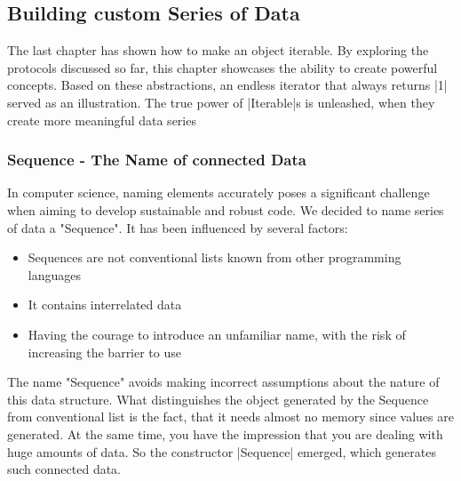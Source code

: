 \subsection{Building custom Series of Data}
\label{sub:Building custom Series of Data}
The last chapter has shown how to make an object iterable. By exploring the 
protocols discussed so far, this chapter showcases the ability to create 
powerful concepts. Based on these abstractions, an endless iterator that always
returns |1| served as an illustration. The true power of |Iterable|s is 
unleashed, when they create more meaningful data series
\subsubsection{Sequence - The Name of connected Data}
\label{subsub:Sequence - The Name of connected Data}
In computer science, naming elements accurately poses a significant challenge 
when aiming to develop sustainable and robust code. We decided to name series
of data a "Sequence". It has been influenced by several factors:

\begin{itemize}
  \item{Sequences are not conventional lists known from other programming languages}
  \item{It contains interrelated data}
  \item{Having the courage to introduce an unfamiliar name, with the risk of increasing the barrier to use}
\end{itemize}

The name "Sequence" avoids making incorrect assumptions about the nature of
this data structure.
\newline
What distinguishes the object generated by the Sequence from conventional list
is the fact, that it needs almost no memory since values are generated. At the 
same time, you have the impression that you are dealing with huge amounts of data.
So the constructor |Sequence| emerged, which generates such connected data.


